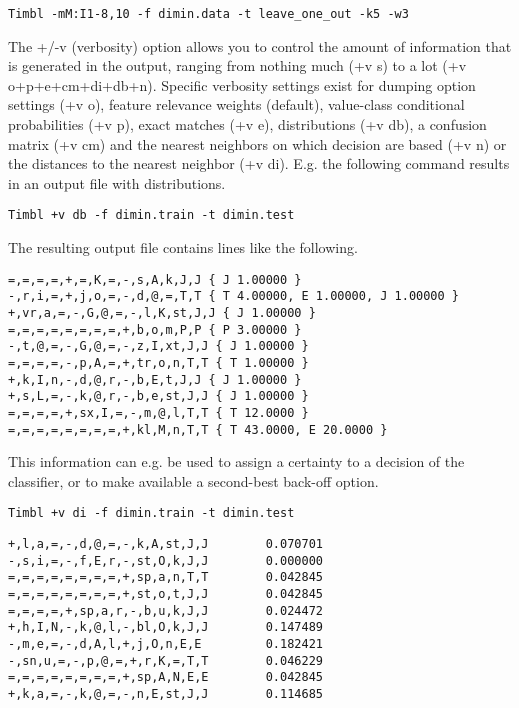 \documentclass{report}
\begin{document}
{\small
\begin{verbatim}
Timbl -mM:I1-8,10 -f dimin.data -t leave_one_out -k5 -w3
\end{verbatim}
}


The {\sc +/-v} (verbosity) option allows you to control the amount of
information that is generated in the output, ranging from nothing much
({\sc +v s}) to a lot ({\sc +v o+p+e+cm+di+db+n}). Specific verbosity
settings exist for dumping option settings ({\sc +v o}), feature
relevance weights (default), value-class conditional probabilities
({\sc +v p}), exact matches ({\sc +v e}), distributions ({\sc +v db}),
a confusion matrix ({\sc +v cm}) and the nearest neighbors on which
decision are based ({\sc +v n}) or the distances to the nearest
neighbor ({\sc +v di}). E.g. the following command results in an
output file with distributions.

{\small
\begin{verbatim}
Timbl +v db -f dimin.train -t dimin.test
\end{verbatim}
}

The resulting output file contains lines like the following.

{\small
\begin{verbatim}
=,=,=,=,+,=,K,=,-,s,A,k,J,J { J 1.00000 }
-,r,i,=,+,j,o,=,-,d,@,=,T,T { T 4.00000, E 1.00000, J 1.00000 }
+,vr,a,=,-,G,@,=,-,l,K,st,J,J { J 1.00000 }
=,=,=,=,=,=,=,=,+,b,o,m,P,P { P 3.00000 }
-,t,@,=,-,G,@,=,-,z,I,xt,J,J { J 1.00000 }
=,=,=,=,-,p,A,=,+,tr,o,n,T,T { T 1.00000 }
+,k,I,n,-,d,@,r,-,b,E,t,J,J { J 1.00000 }
+,s,L,=,-,k,@,r,-,b,e,st,J,J { J 1.00000 }
=,=,=,=,+,sx,I,=,-,m,@,l,T,T { T 12.0000 }
=,=,=,=,=,=,=,=,+,kl,M,n,T,T { T 43.0000, E 20.0000 }
\end{verbatim}
}

This information can e.g. be used to assign a certainty to a decision
of the classifier, or to make available a second-best back-off option.

{\small
\begin{verbatim}
Timbl +v di -f dimin.train -t dimin.test
\end{verbatim}
}

{\small
\begin{verbatim}
+,l,a,=,-,d,@,=,-,k,A,st,J,J        0.070701
-,s,i,=,-,f,E,r,-,st,O,k,J,J        0.000000
=,=,=,=,=,=,=,=,+,sp,a,n,T,T        0.042845
=,=,=,=,=,=,=,=,+,st,o,t,J,J        0.042845
=,=,=,=,+,sp,a,r,-,b,u,k,J,J        0.024472
+,h,I,N,-,k,@,l,-,bl,O,k,J,J        0.147489
-,m,e,=,-,d,A,l,+,j,O,n,E,E         0.182421
-,sn,u,=,-,p,@,=,+,r,K,=,T,T        0.046229
=,=,=,=,=,=,=,=,+,sp,A,N,E,E        0.042845
+,k,a,=,-,k,@,=,-,n,E,st,J,J        0.114685        
\end{verbatim}
}
\end{document}
